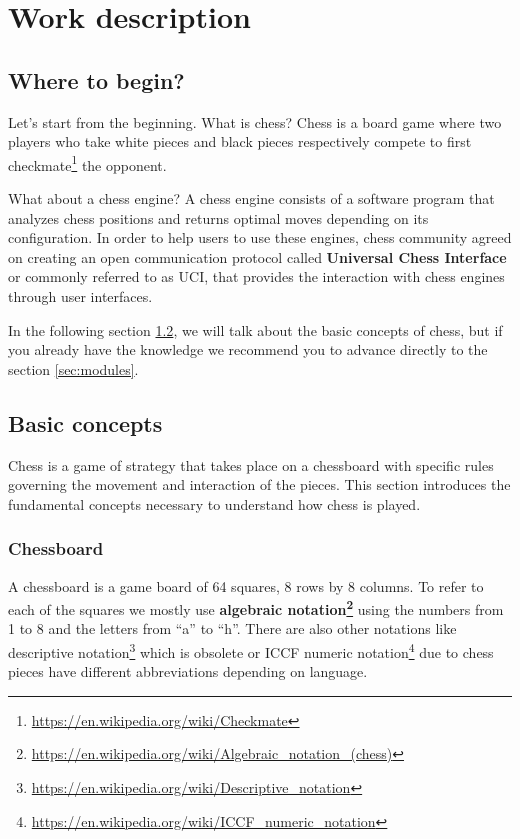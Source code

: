 \chapter{Work description}
\label{cap:descripcionTrabajo}
\renewcommand{\figurename}{Figure}

\section{Where to begin?}

Let's start from the beginning. What is chess? Chess is a board game where two players who take white pieces and black pieces respectively compete to first checkmate\footnote{\url{https://en.wikipedia.org/wiki/Checkmate}} the opponent.

What about a chess engine? A chess engine consists of a software program that analyzes chess positions and returns optimal moves depending on its configuration. In order to help users to use these engines, chess community agreed on creating an open communication protocol called \textbf{Universal Chess Interface} or commonly referred to as UCI, that provides the interaction with chess engines through user interfaces.

In the following section \ref{sec:basicConcepts}, we will talk about the basic concepts of chess, but if you already have the knowledge we recommend you to advance directly to the section \ref{sec:modules}.

\section{Basic concepts}
\label{sec:basicConcepts}

Chess is a game of strategy that takes place on a chessboard with specific rules governing the movement and interaction of the pieces. This section introduces the fundamental concepts necessary to understand how chess is played.

\subsection{Chessboard}
\label{sec:chessboard}

A chessboard is a game board of 64 squares, 8 rows by 8 columns. To refer to each of the squares we mostly use \textbf{algebraic notation\footnote{\url{https://en.wikipedia.org/wiki/Algebraic_notation_(chess)}}} using the numbers from 1 to 8 and the letters from ``a'' to ``h''. There are also other notations like descriptive notation\footnote{\url{https://en.wikipedia.org/wiki/Descriptive_notation}} which is obsolete or ICCF numeric notation\footnote{\url{https://en.wikipedia.org/wiki/ICCF_numeric_notation}} due to chess pieces have different abbreviations depending on language.

